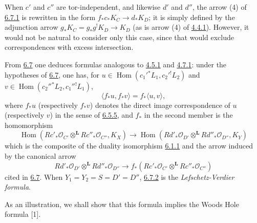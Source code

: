 \documentclass[11pt]{article}
\providecommand{\cO}{\mathcal{O}}
\DeclareMathOperator{\Hom}{Hom}
\providecommand{\Hom}{\operatorname{Hom}}
\providecommand{\Hom}{\operatorname{Hom}}
\begin{document}
When $c'$ and $c''$ are tor-independent, and likewise $d'$ and $d''$, the arrow (4) of \hyperref[sga5:III:equation:6.7.1]{6.7.1} is rewritten in the form $f_*c_*K_C\to d_*K_D$; it is simply defined by the adjunction arrow $g_*K_C=g_*g^!K_D\to K_D$ (as is arrow (4) of \hyperref[sga5:III:equation:4.4.1]{4.4.1}). However, it would not be natural to consider only this case, since that would exclude correspondences with excess intersection.

From \hyperref[sga5:III:theorem:6.7]{6.7} one deduces formulas analogous to \hyperref[sga5:III:equation:4.5.1]{4.5.1} and \hyperref[sga5:III:equation:4.7.1]{4.7.1}: under the hypotheses of \hyperref[sga5:III:theorem:6.7]{6.7}, one has, for $u\in\Hom(c_1'{}^*L_1,c_2'{}^!L_2)$ and $v\in\Hom(c_2''{}^*L_2,c_1''{}^!L_1)$,
\begin{equation}
\tag{6.7.2}\label{sga5:III:equation:6.7.2}
\langle f_*u,f_*v\rangle=f_*\langle u,v\rangle,
\end{equation}
where $f_*u$ (respectively $f_*v$) denotes the direct image correspondence of $u$ (respectively $v$) in the sense of \hyperref[sga5:III:equation:6.5.5]{6.5.5}, and $f_*$ in the second member is the homomorphism
\begin{equation}
\tag{6.7.3}\label{sga5:III:equation:6.7.3}
\Hom(Rc'_*\cO_{C'}\otimes^{\mathbf L}Rc''_*\cO_{C''},K_X)
\longrightarrow
\Hom(Rd'_*\cO_{D'}\otimes^{\mathbf L}Rd''_*\cO_{D''},K_Y)
\end{equation}
which is the composite of the duality isomorphism \hyperref[sga5:III:equation:6.1.1]{6.1.1} and the arrow induced by the canonical arrow
\[
Rd'_*\cO_{D'}\otimes^{\mathbf L}Rd''_*\cO_{D''}\longrightarrow f_*(Rc'_*\cO_{C'}\otimes^{\mathbf L}Rc''_*\cO_{C''})
\]
cited in \hyperref[sga5:III:theorem:6.7]{6.7}. When $Y_1=Y_2=S=D'=D''$, \hyperref[sga5:III:equation:6.7.2]{6.7.2} is the \emph{Lefschetz-Verdier formula}.

As an illustration, we shall show that this formula implies the Woods Hole formula [1].
\end{document}

